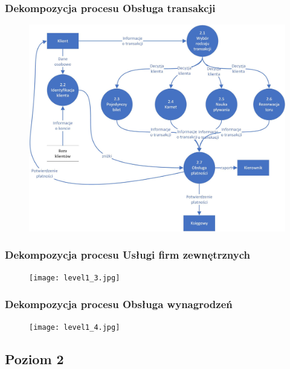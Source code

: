 \documentclass[a4paper,11pt]{article}
\begin{document}
\subsubsection{Dekompozycja procesu Obsługa transakcji}
    \begin{figure}[!htb]
    \centerline{\includegraphics[scale=1.1]{level1_2.jpg}}
    \label{fig:level1_2}
    \end{figure}
    \newpage



\subsubsection{Dekompozycja procesu Usługi firm zewnętrznych}
    \begin{figure}[!htb]
    \centerline{\texttt{[image: level1\_3.jpg]}}
    \label{fig:level1_3}
    \end{figure}
    \newpage
  
\subsubsection{Dekompozycja procesu Obsługa wynagrodzeń}
    \begin{figure}[!htb]
    \centerline{\texttt{[image: level1\_4.jpg]}}
    \label{fig:level1_4}
    \end{figure}
    \newpage  
    
    
    
\subsection{Poziom 2}
\end{document}
